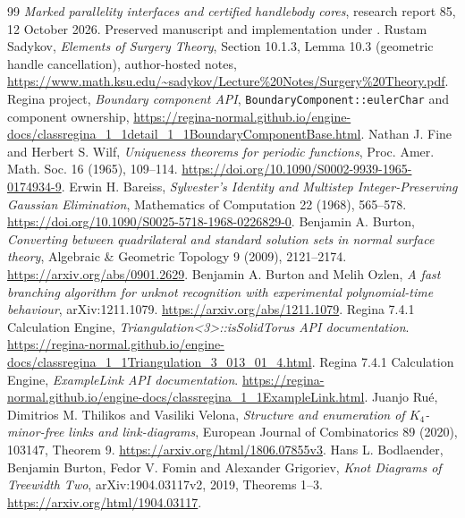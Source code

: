 \documentclass[11pt]{article}
\theoremstyle{remark}
\newcommand{\code}[1]{\texttt{#1}}
\begin{document}
\begin{thebibliography}{99}
\emph{Marked parallelity interfaces and certified handlebody cores},
research report 85, 12 October 2026. Preserved manuscript and implementation
under .
Rustam Sadykov, \emph{Elements of Surgery Theory}, Section 10.1.3,
Lemma 10.3 (geometric handle cancellation), author-hosted notes,
\url{https://www.math.ksu.edu/~sadykov/Lecture\%20Notes/Surgery\%20Theory.pdf}.
Regina project, \emph{Boundary component API},
\code{BoundaryComponent::eulerChar} and component ownership,
\url{https://regina-normal.github.io/engine-docs/classregina_1_1detail_1_1BoundaryComponentBase.html}.
 Nathan J. Fine and Herbert S. Wilf,
\emph{Uniqueness theorems for periodic functions}, Proc. Amer. Math. Soc.
16 (1965), 109--114. \url{https://doi.org/10.1090/S0002-9939-1965-0174934-9}.
 Erwin H. Bareiss,
\emph{Sylvester's Identity and Multistep Integer-Preserving Gaussian Elimination},
Mathematics of Computation 22 (1968), 565--578.
\url{https://doi.org/10.1090/S0025-5718-1968-0226829-0}.
 Benjamin A. Burton, \emph{Converting between quadrilateral and standard solution sets in normal surface theory}, Algebraic \& Geometric Topology 9 (2009), 2121--2174. \url{https://arxiv.org/abs/0901.2629}.
 Benjamin A. Burton and Melih Ozlen,
\emph{A fast branching algorithm for unknot recognition with experimental
polynomial-time behaviour}, arXiv:1211.1079.
\url{https://arxiv.org/abs/1211.1079}.
 Regina 7.4.1 Calculation Engine,
\emph{Triangulation\textless3\textgreater::isSolidTorus API documentation}.
\url{https://regina-normal.github.io/engine-docs/classregina_1_1Triangulation_3_013_01_4.html}.
 Regina 7.4.1 Calculation Engine,
\emph{ExampleLink API documentation}.
\url{https://regina-normal.github.io/engine-docs/classregina_1_1ExampleLink.html}.
 Juanjo Ru\'e, Dimitrios M. Thilikos and
Vasiliki Velona, \emph{Structure and enumeration of $K_4$-minor-free links
and link-diagrams}, European Journal of Combinatorics 89 (2020), 103147,
Theorem 9. \url{https://arxiv.org/html/1806.07855v3}.
 Hans L. Bodlaender, Benjamin Burton,
Fedor V. Fomin and Alexander Grigoriev, \emph{Knot Diagrams of Treewidth
Two}, arXiv:1904.03117v2, 2019, Theorems 1--3.
\url{https://arxiv.org/html/1904.03117}.

\end{thebibliography}
\end{document}
